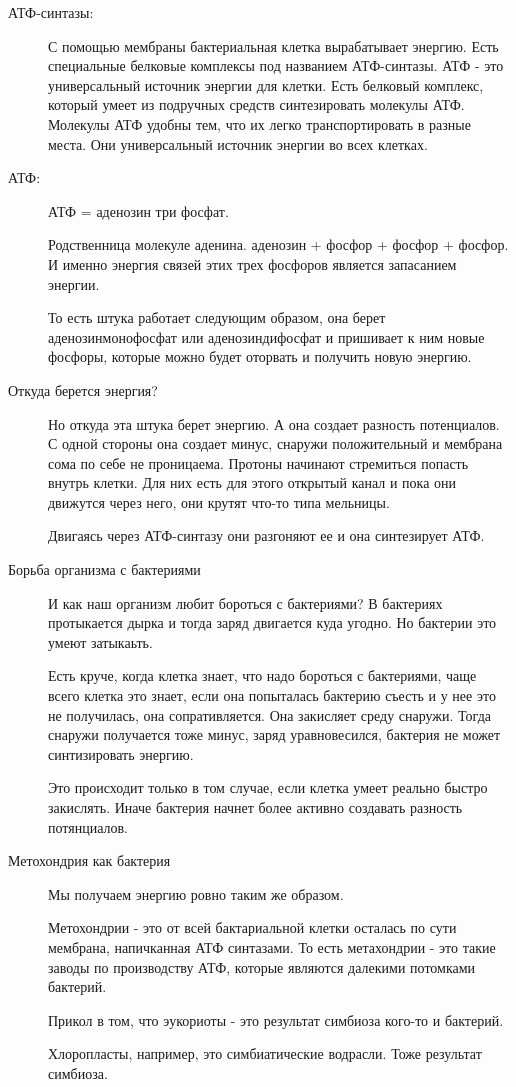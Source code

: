 \begin{description}
\item[АТФ-синтазы:]
С помощью мембраны бактериальная клетка вырабатывает энергию. Есть
специальные белковые комплексы под названием АТФ-синтазы. АТФ - это
универсальный источник энергии для клетки. Есть белковый комплекс,
который умеет из подручных средств синтезировать молекулы АТФ.
Молекулы АТФ удобны тем, что их легко транспортировать в разные места.
Они универсальный источник энергии во всех клетках.

\item[АТФ:]
АТФ = аденозин три фосфат.

Родственница молекуле аденина. аденозин + фосфор + фосфор + фосфор. И именно
энергия связей этих трех фосфоров является запасанием энергии.

То есть штука работает следующим образом, она берет аденозинмонофосфат или 
аденозиндифосфат и пришивает к ним новые фосфоры, которые можно будет оторвать
и получить новую энергию.

\item[Откуда берется энергия?]
Но откуда эта штука берет энергию. А она создает разность потенциалов. С одной
стороны она создает минус, снаружи положительный и мембрана сома по себе не
проницаема. Протоны начинают стремиться попасть внутрь клетки. Для них есть
для этого открытый канал и пока они движутся через него, они крутят что-то типа мельницы.

Двигаясь через АТФ-синтазу они разгоняют ее и она синтезирует АТФ.

\item[Борьба организма с бактериями]
И как наш организм любит бороться с бактериями? В бактериях протыкается
дырка и тогда заряд двигается куда угодно. Но бактерии это умеют затыкаьть.

Есть круче, когда клетка знает, что надо бороться с бактериями, чаще всего клетка это
знает, если она попыталась бактерию съесть и у нее это не получилась, она сопративляется.
Она закисляет среду снаружи. Тогда снаружи получается тоже минус, заряд
уравновесился, бактерия не может синтизировать энергию.

Это происходит только в том случае, если клетка умеет реально быстро закислять. Иначе бактерия
начнет более активно создавать разность потянциалов.

\item[Метохондрия как бактерия]
Мы получаем энергию ровно таким же образом.

Метохондрии - это от всей бактариальной клетки осталась по сути
мембрана, напичканная АТФ синтазами. То есть метахондрии -
это такие заводы по производству АТФ, которые являются далекими
потомками бактерий.

Прикол в том, что эукориоты - это результат
симбиоза кого-то и бактерий.

Хлоропласты, например, это симбиатические водрасли. Тоже
результат симбиоза.   

\end{description}

